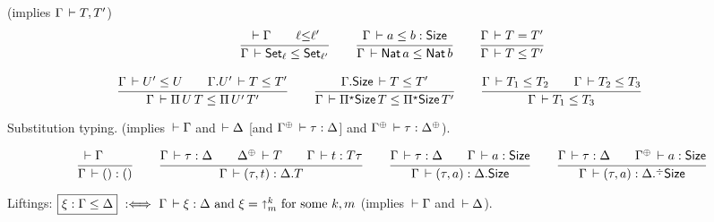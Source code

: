 \documentclass[acmlarge,review,anonymous]{acmart}\settopmatter{printfolios=true}
\begin{document}
 (implies $\Gamma \,\vdash T,T'$)
\begin{gather*}
  \ru{\der \Gamma \qquad \ell {\leq} \ell'
    }{\Gamma \der \Set[\ell] \leq \Set[\ell']}
\qquad
  \ru{\Gamma \der a \leq b : \Size
    }{\Gamma \der \Nat a \leq \Nat b}
\qquad
  \ru{\Gamma \der T = T'
    }{\Gamma \der T \leq T'}
\\[2ex]
  \ru{\Gamma \der U' \leq U \qquad
      \cext \Gamma {U'} \der T \leq T'
    }{\Gamma \der \piT U T \leq \piT {U'} {T'}}
\qquad
  \ru{\cext \Gamma {\Size} \der T \leq T'
    }{\Gamma \der \epiT \Size T \leq \epiT {\Size} {T'}}
\qquad
  \ru{\Gamma \der T_1 \leq T_2 \qquad
      \Gamma \der T_2 \leq T_3
    }{\Gamma \der T_1 \leq T_3}
\qquad
\end{gather*}


Substitution typing. %
\fbox{$\Gamma \der \tau : \Delta$}
(implies $\,\vdash \Gamma$ and $\,\vdash \Delta$
 [and $\resurrect\Gamma \der \tau : \Delta$]
 and $\resurrect\Gamma \der \tau : \resurrect \Delta$).

\begin{gather*}
  \ru{\der \Gamma \qquad
    }{\Gamma \der \sempty : \cempty}
\qquad
  \ru{\Gamma \der \tau : \Delta \qquad
      \resurrect \Delta \der T \qquad
      \Gamma \der t : T \tau
    }{\Gamma \der \sext \tau t : \cext \Delta T}
\qquad
  \ru{\Gamma \der \tau : \Delta \qquad
      \Gamma \der a : \Size
    }{\Gamma \der \sext \tau a : \cext \Delta \Size}
\qquad
  \ru{\Gamma \der \tau : \Delta \qquad
      \resurrect\Gamma \der a : \Size
    }{\Gamma \der \sext \tau a : \erext \Delta \Size}
\end{gather*}

Liftings: $\fbox{$\xi : \Gamma \leq \Delta$}
  \mathrel{\ :\Longleftrightarrow\ } \Gamma \,\vdash \xi : \Delta \ \mbox{and}\  \xi = \mathord{\shortuparrow}^k_m \ \mbox{for some}\  k,m$
(implies $\,\vdash \Gamma$ and $\,\vdash \Delta$).
\end{document}
